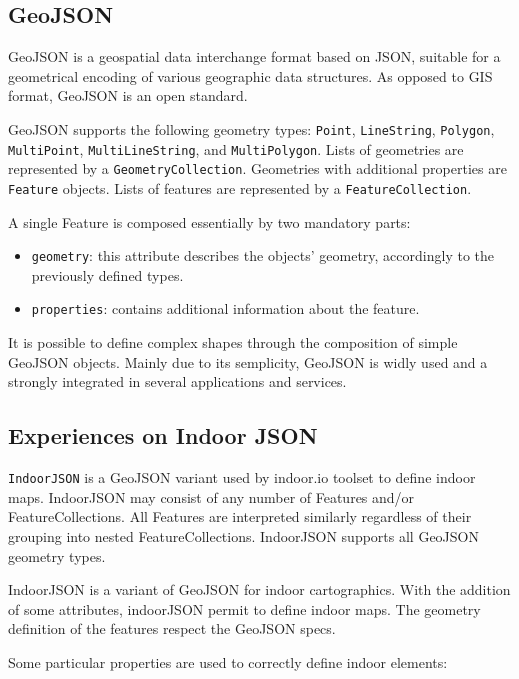 \documentclass{sig-alternate}
\begin{document}
\subsection{GeoJSON}\label{geojson}

GeoJSON is a geospatial data interchange format based on JSON, suitable
for a geometrical encoding of various geographic data structures. As
opposed to GIS format, GeoJSON is an open standard.

GeoJSON supports the following geometry types: \texttt{Point},
\texttt{LineString}, \texttt{Polygon}, \texttt{MultiPoint},
\texttt{MultiLineString}, and \texttt{MultiPolygon}. Lists of geometries
are represented by a \texttt{GeometryCollection}. Geometries with
additional properties are \texttt{Feature} objects. Lists of features
are represented by a \texttt{FeatureCollection}.

A single Feature is composed essentially by two mandatory parts:

\begin{itemize}
\itemsep1pt\parskip0pt
\item
  \texttt{geometry}: this attribute describes the objects' geometry,
  accordingly to the previously defined types.
\item
  \texttt{properties}: contains additional information about the
  feature.
\end{itemize}

It is possible to define complex shapes through the composition of
simple GeoJSON objects. Mainly due to its semplicity, GeoJSON is widly
used and a strongly integrated in several applications and services.

\subsection{Experiences on Indoor
JSON}\label{experiences-on-indoor-json}

\texttt{IndoorJSON} is a GeoJSON variant used by indoor.io toolset to
define indoor maps. IndoorJSON may consist of any number of Features
and/or FeatureCollections. All Features are interpreted similarly
regardless of their grouping into nested FeatureCollections. IndoorJSON
supports all GeoJSON geometry types.

IndoorJSON is a variant of GeoJSON for indoor cartographics. With the
addition of some attributes, indoorJSON permit to define indoor maps.
The geometry definition of the features respect the GeoJSON specs.

Some particular properties are used to correctly define indoor elements:
\end{document}
